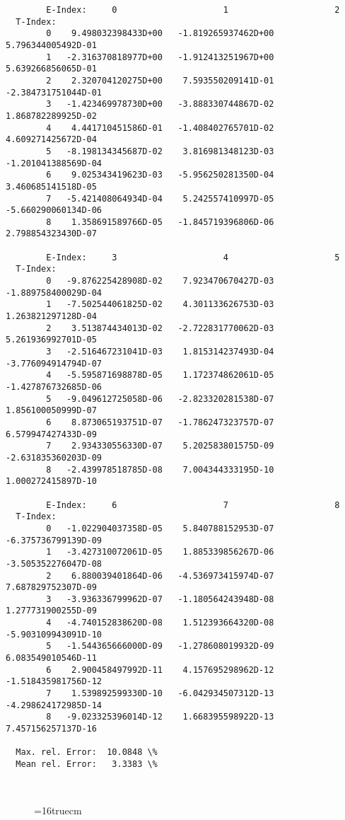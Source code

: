 \documentclass[12pt,dvipdfmx]{article}
\begin{document}
\begin{small}\begin{verbatim}
        E-Index:     0                     1                     2
  T-Index:
        0    9.498032398433D+00   -1.819265937462D+00    5.796344005492D-01
        1   -2.316370818977D+00   -1.912413251967D+00    5.639266856065D-01
        2    2.320704120275D+00    7.593550209141D-01   -2.384731751044D-01
        3   -1.423469978730D+00   -3.888330744867D-02    1.868782289925D-02
        4    4.441710451586D-01   -1.408402765701D-02    4.609271425672D-04
        5   -8.198134345687D-02    3.816981348123D-03   -1.201041388569D-04
        6    9.025343419623D-03   -5.956250281350D-04    3.460685141518D-05
        7   -5.421408064934D-04    5.242557410997D-05   -5.660290060134D-06
        8    1.358691589766D-05   -1.845719396806D-06    2.798854323430D-07

        E-Index:     3                     4                     5
  T-Index:
        0   -9.876225428908D-02    7.923470670427D-03   -1.889758400029D-04
        1   -7.502544061825D-02    4.301133626753D-03    1.263821297128D-04
        2    3.513874434013D-02   -2.722831770062D-03    5.261936992701D-05
        3   -2.516467231041D-03    1.815314237493D-04   -3.776094914794D-07
        4   -5.595871698878D-05    1.172374862061D-05   -1.427876732685D-06
        5   -9.049612725058D-06   -2.823320281538D-07    1.856100050999D-07
        6    8.873065193751D-07   -1.786247323757D-07    6.579947427433D-09
        7    2.934330556330D-07    5.202583801575D-09   -2.631835360203D-09
        8   -2.439978518785D-08    7.004344333195D-10    1.000272415897D-10

        E-Index:     6                     7                     8
  T-Index:
        0   -1.022904037358D-05    5.840788152953D-07   -6.375736799139D-09
        1   -3.427310072061D-05    1.885339856267D-06   -3.505352276047D-08
        2    6.880039401864D-06   -4.536973415974D-07    7.687829752307D-09
        3   -3.936336799962D-07   -1.180564243948D-08    1.277731900255D-09
        4   -4.740152838620D-08    1.512393664320D-08   -5.903109943091D-10
        5   -1.544365666000D-09   -1.278608019932D-09    6.083549010546D-11
        6    2.900458497992D-11    4.157695298962D-12   -1.518435981756D-12
        7    1.539892599330D-10   -6.042934507312D-13   -4.298624172985D-14
        8   -9.023325396014D-12    1.668395598922D-13    7.457156257137D-16

  Max. rel. Error:  10.0848 \%
  Mean rel. Error:   3.3383 \%



\end{verbatim}\end{small}
\begin{figure} \label{2.3.6il1}
\epsfxsize=16truecm
\end{figure}
\newpage
\end{document}

